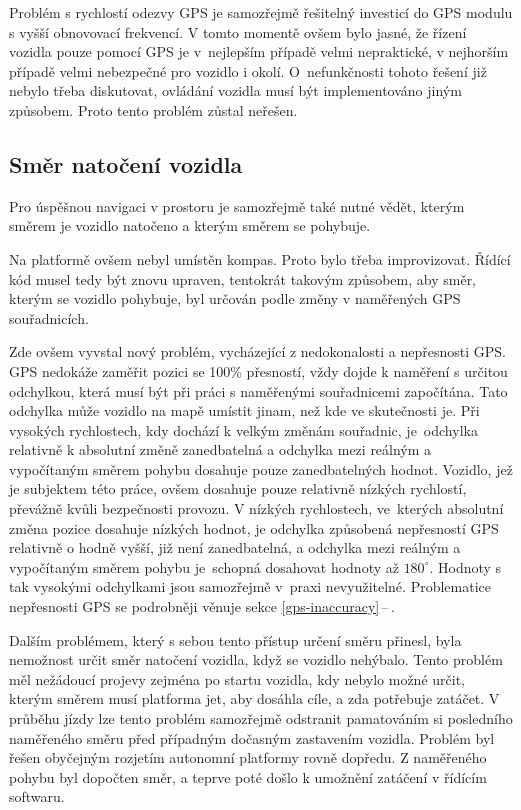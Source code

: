 \documentclass[czech, bachelor]{diploma}
\newcommand{\filipref}[1]{\ref{#1}\,--\,\nameref{#1}}
\begin{document}
Problém s rychlostí odezvy GPS je samozřejmě řešitelný investicí do GPS modulu s vyšší obnovovací frekvencí. V tomto momentě ovšem
bylo jasné, že řízení vozidla pouze pomocí GPS je v~nejlepším případě velmi nepraktické, v nejhorším případě velmi nebezpečné
pro vozidlo i okolí. O~nefunkčnosti tohoto řešení již nebylo třeba diskutovat, ovládání vozidla musí být implementováno jiným
způsobem. Proto tento problém zůstal neřešen.

\subsection{Směr natočení vozidla} \label{directions-and-angles}

Pro úspěšnou navigaci v prostoru je samozřejmě také nutné vědět, kterým směrem je vozidlo natočeno a kterým směrem se pohybuje.

Na platformě ovšem nebyl umístěn kompas. Proto bylo třeba improvizovat. Řídící kód musel tedy být znovu upraven, tentokrát takovým
způsobem, aby směr, kterým se vozidlo pohybuje, byl určován podle změny v naměřených GPS souřadnicích.

Zde ovšem vyvstal nový problém, vycházející z nedokonalosti a nepřesnosti GPS. GPS nedokáže zaměřit pozici se 100\% přesností,
vždy dojde k naměření s určitou odchylkou, která musí být při práci s naměřenými souřadnicemi započítána. Tato odchylka může
vozidlo na mapě umístit jinam, než kde ve skutečnosti je. Při vysokých rychlostech, kdy dochází k velkým změnám souřadnic,
je~odchylka relativně k absolutní změně zanedbatelná a odchylka mezi reálným a vypočítaným směrem pohybu dosahuje pouze
zanedbatelných hodnot. Vozidlo, jež je subjektem této práce, ovšem dosahuje pouze relativně nízkých rychlostí, převážně kvůli
bezpečnosti provozu. V nízkých rychlostech, ve~kterých absolutní změna pozice dosahuje nízkých hodnot, je odchylka způsobená
nepřesností GPS relativně o hodně vyšší, již není zanedbatelná, a odchylka mezi reálným a vypočítaným směrem pohybu je~schopná
dosahovat hodnoty až $180^{\circ}$. Hodnoty s tak vysokými odchylkami jsou samozřejmě v~praxi nevyužitelné. Problematice
nepřesnosti GPS se podrobněji věnuje sekce \filipref{gps-inaccuracy}.

Dalším problémem, který s sebou tento přístup určení směru přinesl, byla nemožnost určit směr natočení vozidla, když se vozidlo
nehýbalo. Tento problém měl nežádoucí projevy zejména po startu vozidla, kdy nebylo možné určit, kterým směrem musí platforma jet,
aby dosáhla cíle, a zda potřebuje zatáčet. V průběhu jízdy lze tento problém samozřejmě odstranit pamatováním si posledního
naměřeného směru před případným dočasným zastavením vozidla. Problém byl řešen obyčejným rozjetím autonomní platformy rovně
dopředu. Z naměřeného pohybu byl dopočten směr, a teprve poté došlo k umožnění zatáčení v řídícím softwaru.
\end{document}
